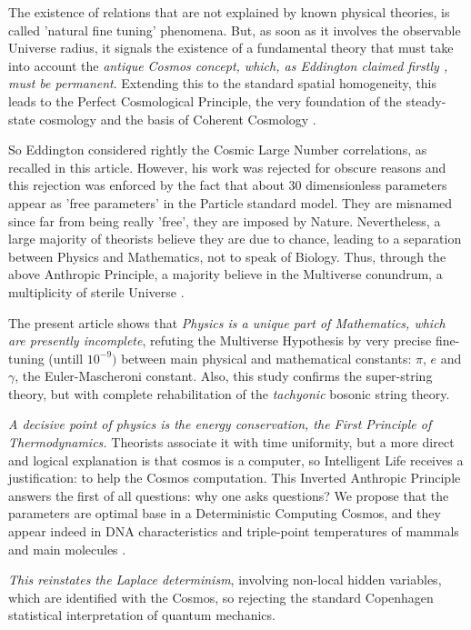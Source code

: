 \documentclass[twoside,draft]{article}
\begin{document}
\begin{sloppypar}
The existence of relations that are not explained by known physical theories, is called 'natural fine tuning' phenomena. But, as soon as it involves the observable Universe radius, it signals the existence of a fundamental theory that must take into account the \textit{antique Cosmos concept, which, as Eddington claimed firstly \cite{Eddington}, must be permanent}. Extending this to the standard spatial homogeneity, this leads to the Perfect Cosmological Principle, the very foundation of the steady-state cosmology and the basis of Coherent Cosmology \cite{Sanchez1}.

So Eddington considered rightly the Cosmic Large Number correlations, as recalled in this article. However, his work was rejected for obscure reasons and this rejection was enforced by the fact that about 30 dimensionless parameters appear as 'free parameters' in the Particle standard model. They are misnamed since far from being really 'free', they are imposed by Nature. Nevertheless, a large majority of theorists believe they are due to chance, leading to a separation between Physics and Mathematics, not to speak of Biology. Thus, through the above Anthropic Principle, a majority believe in the Multiverse conundrum, a multiplicity of sterile Universe \cite{Carr}.

The present article shows that \textit{Physics is a unique part of Mathematics, which are presently incomplete}, refuting the Multiverse Hypothesis by very precise fine-tuning (untill $10^{-9})$ between main physical and mathematical constants: $\pi$, $e$ and $\gamma$, the Euler-Mascheroni constant. Also, this study confirms the super-string theory, but with complete rehabilitation of the \textit{tachyonic} bosonic string theory.

\textit{A decisive point of physics is the energy conservation, the First Principle of Thermodynamics.} Theorists associate it with time uniformity, but a more direct and logical explanation is that cosmos is a computer, so Intelligent Life receives a justification: to help the Cosmos computation. This Inverted Anthropic Principle answers the first of all questions: why one asks questions? We propose that the parameters are optimal base in a Deterministic Computing Cosmos, and they appear indeed in DNA characteristics and triple-point temperatures of mammals and main molecules \cite{Sanchez1}.

\textit{This reinstates the Laplace determinism}, involving non-local hidden variables, which are identified with the Cosmos, so rejecting the standard Copenhagen statistical interpretation of quantum mechanics.


\end{sloppypar}
\end{document}
